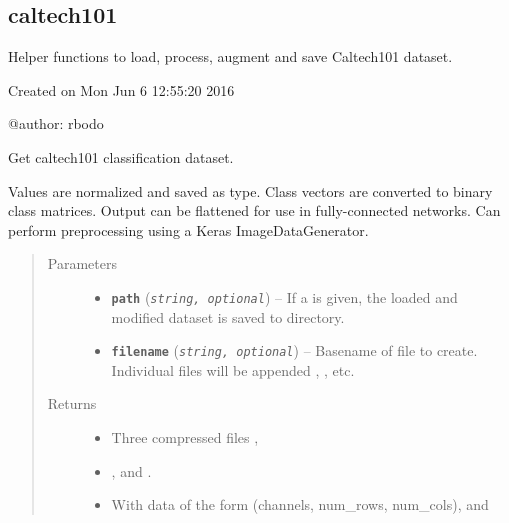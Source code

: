 \documentclass[letterpaper,10pt,english]{sphinxmanual}
\begin{document}
\subsection{caltech101}
\label{snntoolbox.io_utils:caltech101}\label{snntoolbox.io_utils:module-snntoolbox.io_utils.caltech101_load}
Helper functions to load, process, augment and save Caltech101 dataset.

Created on Mon Jun  6 12:55:20 2016

@author: rbodo

\begin{fulllineitems}
\label{snntoolbox.io_utils:snntoolbox.io_utils.caltech101_load.get_caltech101}
Get caltech101 classification dataset.

Values are normalized and saved as  type. Class vectors are
converted to binary class matrices. Output can be flattened for use in
fully-connected networks. Can perform preprocessing using a Keras
ImageDataGenerator.
\begin{quote}\begin{description}
\item[{Parameters}] \leavevmode\begin{itemize}
\item {} 
\textbf{\texttt{path}} (\emph{\texttt{string, optional}}) -- If a  is given, the loaded and modified dataset is saved to
 directory.

\item {} 
\textbf{\texttt{filename}} (\emph{\texttt{string, optional}}) -- Basename of file to create. Individual files will be appended
, , etc.

\end{itemize}

\item[{Returns}] \leavevmode
\begin{itemize}
\item {} 
Three compressed files ,

\item {} 
, and .

\item {} 
With data of the form (channels, num\_rows, num\_cols),  and


\end{itemize}
\end{description}
\end{quote}
\end{fulllineitems}
\end{document}
